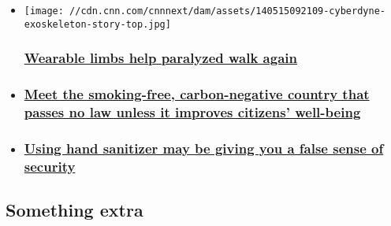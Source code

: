 \begin{itemize}
\item
  \href{/2019/09/18/health/japan-cyberdyne-brain-wave-exoskeleton-wellness-scn-hnk-intl/index.html}{}

  \texttt{[image: //cdn.cnn.com/cnnnext/dam/assets/140515092109-cyberdyne-exoskeleton-story-top.jpg]}

  \hypertarget{wearable-limbs-help-paralyzed-walk-again}{%
  \subsubsection{\texorpdfstring{\href{/2019/09/18/health/japan-cyberdyne-brain-wave-exoskeleton-wellness-scn-hnk-intl/index.html}{Wearable
  limbs help paralyzed walk
  again}}{Wearable limbs help paralyzed walk again}}\label{wearable-limbs-help-paralyzed-walk-again}}
\item
  \hypertarget{meet-the-smoking-free-carbon-negative-country-that-passes-no-law-unless-it-improves-citizens-well-being}{%
  \subsubsection{\texorpdfstring{\href{/2019/09/13/health/bhutan-gross-national-happiness-wellness/index.html}{Meet
  the smoking-free, carbon-negative country that passes no law unless it
  improves citizens'
  well-being}}{Meet the smoking-free, carbon-negative country that passes no law unless it improves citizens' well-being}}\label{meet-the-smoking-free-carbon-negative-country-that-passes-no-law-unless-it-improves-citizens-well-being}}
\item
  \hypertarget{using-hand-sanitizer-may-be-giving-you-a-false-sense-of-security}{%
  \subsubsection{\texorpdfstring{\href{/2019/09/18/health/flu-cold-hand-sanitizer-wellness/index.html}{Using
  hand sanitizer may be giving you a false sense of
  security}}{Using hand sanitizer may be giving you a false sense of security}}\label{using-hand-sanitizer-may-be-giving-you-a-false-sense-of-security}}
\end{itemize}

\hypertarget{something-extra-}{%
\subsection{Something extra~}\label{something-extra-}}

